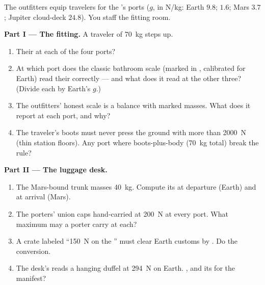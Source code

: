 \begin{problem}\label{pb:g9:weight-vs-mass:1}
The outfitters equip travelers for the 's ports
($g$, in \unit{N/kg}: Earth $9.8$;  $1.6$; Mars $3.7$;
Jupiter cloud-deck $24.8$). You staff the fitting room.

\medskip\noindent\textbf{Part I --- The fitting.}
A traveler of  \qty{70}{kg} steps up.
\begin{enumerate}
  \item Their  at each of the four ports?
  \item At which port does the classic bathroom scale
        (marked in , calibrated for Earth) read
        their  correctly --- and what does it read at
        the other three? (Divide each  by Earth's
        $g$.)
  \item The outfitters' honest scale is a balance with
        marked masses. What does it report at each port,
        and why?
  \item The traveler's boots must never press the ground
        with more than \qty{2000}{N} (thin station floors).
        Any port where boots-plus-body (\qty{70}{kg} total)
        break the rule?
\end{enumerate}

\medskip\noindent\textbf{Part II --- The luggage desk.}
\begin{enumerate}[resume]
  \item The Mars-bound trunk masses \qty{40}{kg}. Compute
        its  at departure (Earth) and at arrival
        (Mars).
  \item The porters' union caps hand-carried \emph{}
        at \qty{200}{N} at every port. What maximum
        \emph{} may a porter carry at each?
  \item A crate labeled ``\qty{150}{N} on the '' must
        clear Earth customs by . Do the conversion.
  \item The desk's  reads a hanging duffel at
        \qty{294}{N} on Earth. , and its  
        for the manifest?
\end{enumerate}


\end{problem}

